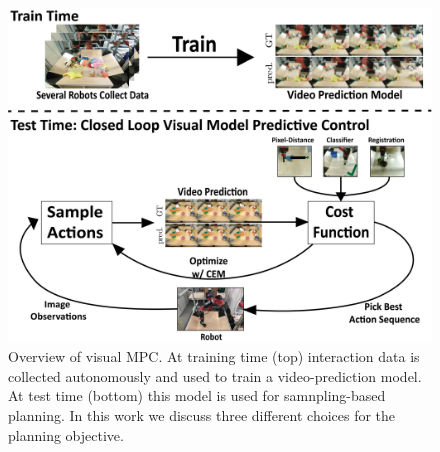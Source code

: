 
\begin{figure}[t]
\centering
\includegraphics[width=\columnwidth,trim={0mm 0 0 0},clip]{images_general/overview_roughdraft.png}
\caption{\small{Overview of visual MPC. At training time (top) interaction data is collected autonomously and used to train a video-prediction model. At test time (bottom) this model is used for samnpling-based planning. In this work we discuss three different choices for the planning objective.}}
\label{fig:overview}
\end{figure}


